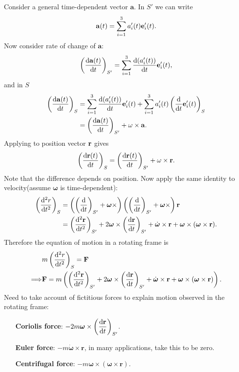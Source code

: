 Consider a general time-dependent vector $ \mathbf{a} $. In $ S' $ we can write
\[
    \mathbf{a}(t) = \sum_{i=1}^{3} a_i'(t){\bf e}_i'(t).
\]
Now consider rate of change of $ \mathbf{a} $:
\[
    \left( \frac{\mathrm{d}{\bf a}(t)}{\mathrm{d}t}  \right)_{S'} = \sum_{i=1}^{3}\frac{\mathrm{d}(a_i'(t))}{\mathrm{d}t}{\bf e}_i'(t) ,
\] 
and in $S$ 
\begin{align*}
    \left( \frac{\mathrm{d}{\bf a}(t)}{\mathrm{d}t} \right)_S 
    &= \sum_{i=1}^{3}\frac{\mathrm{d}(a_i'(t))}{\mathrm{d}t}{\bf e}_i'(t) + \sum_{i=1}^{3} a_i'(t) \left( \frac{\mathrm{d}}{\mathrm{d}t}{\bf e}_i'(t) \right)_S \\ 
    &= \left( \frac{\mathrm{d}{\bf a}(t)}{\mathrm{d}t}  \right)_{S'}+\omega \times {\bf a}.
\end{align*}
Applying to position vector ${\bf r}$  gives
\[
    \left( \frac{\mathrm{d}{\bf r}(t)}{\mathrm{d}t} \right)_S=\left( \frac{\mathrm{d}{\bf r}(t)}{\mathrm{d}t}  \right)_{S'}+\omega \times {\bf r}.
\]
Note that the difference depends on position. Now apply the same identity to velocity(assume $ \boldsymbol{\omega} $ is time-dependent):
\begin{align*}
    \left( \frac{\mathrm{d}^2r}{\mathrm{d}t^2}  \right)_S &= \left( \left( \frac{\mathrm{d}}{\mathrm{d}t}  \right)_{S'}+\boldsymbol{\omega}\times  \right)\left( \left( \frac{\mathrm{d}}{\mathrm{d}t}  \right)_{S'}+\boldsymbol{\omega}\times  \right){\bf r}\\ 
    &=\left( \frac{\mathrm{d}^2{\bf r}}{\mathrm{d}t^2}  \right)_{S'}+2 \boldsymbol{\omega}\times \left( \frac{\mathrm{d}{\bf r}}{\mathrm{d}t}  \right)_{S'}+\dot{\boldsymbol{\omega}}\times \mathbf{r}+\boldsymbol{\omega} \times (\boldsymbol{\omega} \times \mathbf{r}).
\end{align*}
Therefore the equation of motion in a rotating frame is 
\begin{align*}
    &m \left( \frac{\mathrm{d}^2r}{\mathrm{d}t^2}  \right)_S ={\bf F}\\ 
    \Longrightarrow &{\bf F}= m\left( \left( \frac{\mathrm{d}^2{\bf r}}{\mathrm{d}t^2}  \right)_{S'}+2 \boldsymbol{\omega}\times \left( \frac{\mathrm{d}{\bf r}}{\mathrm{d}t}  \right)_{S'}+\dot{\boldsymbol{\omega}}\times \mathbf{r}+\boldsymbol{\omega} \times (\boldsymbol{\omega} \times \mathbf{r}) \right).
\end{align*}
Need to take account of fictitious forces to explain motion observed in the rotating frame:
\begin{enumerate}[align=left]
    \item[\textbf{Coriolis force}:] $\displaystyle -2m\boldsymbol{\omega}\times \left( \frac{\mathrm{d}{\bf r}}{\mathrm{d}t}  \right)_{S'}$.
    \item[\textbf{Euler force}:] $\displaystyle -m\dot{\boldsymbol{\omega}}\times \mathbf{r}$, in many applications, take this to be zero.
    \item[\textbf{Centrifugal force}:] $\displaystyle -m\boldsymbol{\omega} \times (\boldsymbol{\omega} \times \mathbf{r})$.
\end{enumerate}